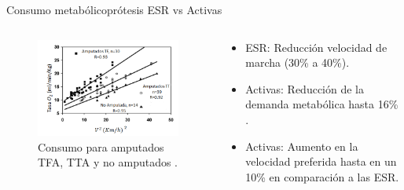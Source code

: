 \documentclass[10pt]{beamer}
\begin{document}
\begin{frame}{Consumo metabólico}{prótesis ESR vs Activas}

\begin{columns}[t]


\column{75 mm}
\begin{block}{}
{\footnotesize{}}

\begin{figure}
\begin{centering}
\includegraphics[scale=0.42]{Feathergraphics/consumo}
\par\end{centering}
\caption{{\footnotesize{}Consumo para amputados TFA, TTA y no amputados \cite{Schmalz2002}.}}\par
\end{figure}

\end{block}

\column{40 mm}
\begin{exampleblock}{}

\begin{itemize}
\item {\scriptsize{}ESR: Reducción velocidad de marcha (30\% a 40\%)\cite{Schmalz2002}.}{\scriptsize \par}
\end{itemize}
\vspace{12 mm}
\begin{itemize}
\item {\scriptsize{}Activas: Reducción de la demanda metabólica hasta 16\%
\cite{Herr2010,Esposito2015}.}{\scriptsize \par}
\end{itemize}
\vspace{12 mm}
\begin{itemize}
\item {\scriptsize{}Activas: Aumento en la velocidad preferida hasta en
un 10\% en comparación a las ESR\cite{Gates2013}.}{\scriptsize \par}
\end{itemize}
\end{exampleblock}
\end{columns}

\end{frame}
\end{document}
